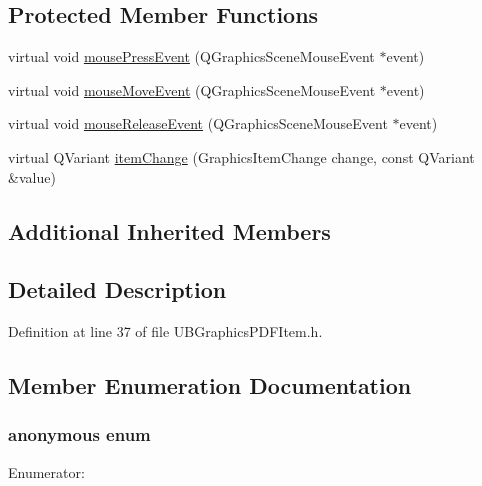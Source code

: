 \subsection*{Protected Member Functions}
\begin{DoxyCompactItemize}
\item 
virtual void \hyperlink{class_u_b_graphics_p_d_f_item_ab7ab474b8d1af98f38ce89ba2557d7ec}{mouse\-Press\-Event} (Q\-Graphics\-Scene\-Mouse\-Event $\ast$event)
\item 
virtual void \hyperlink{class_u_b_graphics_p_d_f_item_ad0f28003ae93f7a471adc2b9db806696}{mouse\-Move\-Event} (Q\-Graphics\-Scene\-Mouse\-Event $\ast$event)
\item 
virtual void \hyperlink{class_u_b_graphics_p_d_f_item_a8bd8f4e9134fc67adaac0713d635be42}{mouse\-Release\-Event} (Q\-Graphics\-Scene\-Mouse\-Event $\ast$event)
\item 
virtual Q\-Variant \hyperlink{class_u_b_graphics_p_d_f_item_a9598fc1f6236c8ed5c0ff24f0505fe48}{item\-Change} (Graphics\-Item\-Change change, const Q\-Variant \&value)
\end{DoxyCompactItemize}
\subsection*{Additional Inherited Members}


\subsection{Detailed Description}


Definition at line 37 of file U\-B\-Graphics\-P\-D\-F\-Item.\-h.



\subsection{Member Enumeration Documentation}
\hypertarget{class_u_b_graphics_p_d_f_item_a56e43a0129d572d8c4b5455234ea27d4}{\subsubsection[{anonymous enum}]{\setlength{\rightskip}{0pt plus 5cm}anonymous enum}}\label{d9/d0d/class_u_b_graphics_p_d_f_item_a56e43a0129d572d8c4b5455234ea27d4}
\begin{Desc}
\item[Enumerator\-: ]\par
\begin{description}
\item[{\em 
\hypertarget{class_u_b_graphics_p_d_f_item_a56e43a0129d572d8c4b5455234ea27d4a9b0affff6e387354ac8fc3d678c6c10d}{Type}\label{d9/d0d/class_u_b_graphics_p_d_f_item_a56e43a0129d572d8c4b5455234ea27d4a9b0affff6e387354ac8fc3d678c6c10d}
}]\end{description}
\end{Desc}



